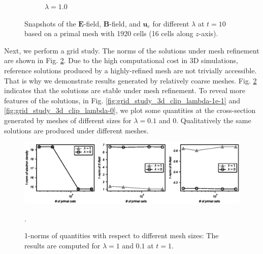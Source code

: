 \documentclass{article}
\begin{document}
\begin{figure}
\begin{subfigure}[b]{\textwidth}
        \caption{$\lambda = 1.0$}
    \end{subfigure}
    \caption{Snapshots of the $\mathbf{E}$-field, $\mathbf{B}$-field, and $\mathbf{u}_e$ for different $\lambda$ at $t = 10$ based on a primal mesh with 1920 cells (16 cells along $z$-axis). } 
    \label{fig:3d_vec_field_E_B_ue}
\end{figure}

Next, we perform a grid study. The norms of the solutions under mesh refinement are shown in Fig. \ref{fig:grid_study_3d}. Due to the high computational cost in 3D simulations, reference solutions produced by a highly-refined mesh are not trivially accessible. That is why we demonstrate results generated by relatively coarse meshes. Fig. \ref{fig:grid_study_3d} indicates that the solutions are stable under mesh refinement. To reveal more features of the solutions, in Fig. \ref{fig:grid_study_3d_clip_lambda-1e-1} and \ref{fig:grid_study_3d_clip_lambda-0}, we plot some quantities at the cross-section generated by meshes of different sizes for $\lambda = 0.1$ and $0$. Qualitatively the same solutions are produced under different meshes.

\begin{figure}
    \centering
    \includegraphics[scale=0.8]{norm-vs-mesh.eps}
    \caption{1-norms of quantities with respect to different mesh sizes: The results are computed for $\lambda = 1$ and $0.1$ at $t = 1$.}.
    \label{fig:grid_study_3d}
\end{figure}
\end{document}
